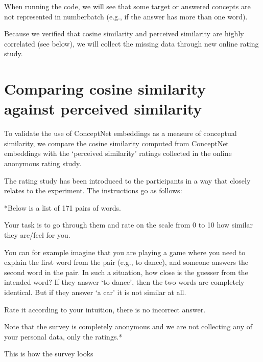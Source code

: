 \documentclass[
  letterpaper,
  DIV=11,
  numbers=noendperiod]{scrreprt}
\begin{document}
When running the code, we will see that some target or answered concepts
are not represented in numberbatch (e.g., if the answer has more than
one word).

Because we verified that cosine similarity and perceived similarity are
highly correlated (see below), we will collect the missing data through
new online rating study.


\chapter{Comparing cosine similarity against perceived
similarity}\label{comparing-cosine-similarity-against-perceived-similarity}

To validate the use of ConceptNet embeddings as a measure of conceptual
similarity, we compare the cosine similarity computed from ConceptNet
embeddings with the `perceived similarity' ratings collected in the
online anonymous rating study.

The rating study has been introduced to the participants in a way that
closely relates to the experiment. The instructions go as follows:

*Below is a list of 171 pairs of words.

Your task is to go through them and rate on the scale from 0 to 10 how
similar they are/feel for you.

You can for example imagine that you are playing a game where you need
to explain the first word from the pair (e.g., to dance), and someone
answers the second word in the pair. In such a situation, how close is
the guesser from the intended word? If they answer `to dance', then the
two words are completely identical. But if they answer `a car' it is not
similar at all.

Rate it according to your intuition, there is no incorrect answer.

Note that the survey is completely anonymous and we are not collecting
any of your personal data, only the ratings.*

This is how the survey looks
\end{document}

